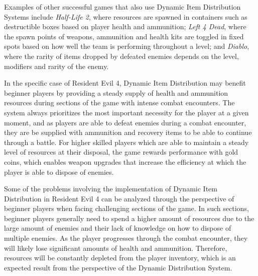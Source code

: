 Examples of other successful games that also use Dynamic Item Distribution Systems include \emph{Half-Life 2}, where resources are spawned in containers such as destructible boxes based on player health and ammunition; \emph{Left 4 Dead}, where the spawn points of weapons, ammunition and health kits are toggled in fixed spots based on how well the team is performing throughout a level; and \emph{Diablo}, where the rarity of items dropped by defeated enemies depends on the level, modifiers and rarity of the enemy.

In the specific case of Resident Evil 4, Dynamic Item Distribution may benefit beginner players by providing a steady supply of health and ammunition resources during sections of the game with intense combat encounters. The system always prioritizes the most important necessity for the player at a given moment, and as players are able to defeat enemies during a combat encounter, they are be supplied with ammunition and recovery items to be able to continue through a battle. For higher skilled players which are able to maintain a steady level of resources at their disposal, the game rewards performance with gold coins, which enables weapon upgrades that increase the efficiency at which the player is able to dispose of enemies. 



Some of the problems involving the implementation of Dynamic Item Distribution in Resident Evil 4 can be analyzed through the perspective of beginner players when facing challenging sections of the game. In such sections, beginner players generally need to spend a higher amount of resources due to the large amount of enemies and their lack of knowledge on how to dispose of multiple enemies. As the player progresses through the combat encounter, they will likely lose significant amounts of health and ammunition. Therefore, resources will be constantly depleted from the player inventory, which is an expected result from the perspective of the Dynamic Distribution System. 

